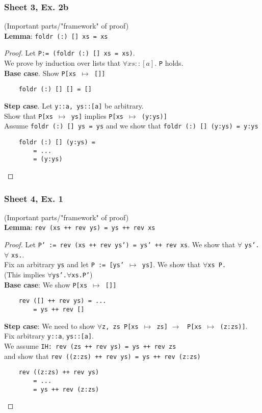 \documentclass[12pt]{article}
\def\li{\rightarrow}
\begin{document}
\subsubsection{Sheet 3, Ex. 2b}
(Important parts/"framework" of proof) \\
\textbf{Lemma}: \texttt{foldr (:) [] xs = xs}
\begin{proof}
    Let \texttt{P:= (foldr (:) [] xs = xs)}. \\
    We prove by induction over lists that $\forall xs::[a].$ \texttt{P} holds. \\
    \textbf{Base case}. Show \texttt{P[xs $\mapsto$ []]} 
    \begin{verbatim}
    foldr (:) [] [] = [] 
    \end{verbatim}
    \textbf{Step case}. Let \texttt{y::a, ys::[a]} be arbitrary. \\
    Show that \texttt{P[xs $\mapsto$ ys]} implies \texttt{P[xs $\mapsto$ (y:ys)]} \\
    Assume \texttt{foldr (:) [] ys = ys} and we show that \texttt{foldr (:) [] (y:ys) = y:ys}
    \begin{verbatim}
    foldr (:) [] (y:ys) = 
        = ...
        = (y:ys)
    \end{verbatim}
\end{proof}
\subsubsection{Sheet 4, Ex. 1}
(Important parts/"framework" of proof) \\
\textbf{Lemma}: \texttt{rev (xs ++ rev ys) = ys ++ rev xs}
\begin{proof}
    Let \texttt{P' := rev (xs ++ rev ys') = ys' ++ rev xs}. 
    We show that $\forall$ \texttt{ys'.}$\forall$ \texttt{xs.}. \\
    Fix an arbitrary \texttt{ys} and let \texttt{P := [ys' $\mapsto$ ys]}.
    We show that $\forall$\texttt{xs P.} \\
    (This implies $\forall$\texttt{ys'.}$\forall$\texttt{xs.P'}) \\
    \textbf{Base case}: We show \texttt{P[xs $\mapsto$ []]} 
    \begin{verbatim}
    rev ([] ++ rev ys) = ...
        = ys ++ rev []
    \end{verbatim}
    \textbf{Step case}: We need to show 
    $\forall$\texttt{z, zs P[xs $\mapsto$ zs]} $\li$ \texttt{ P[xs $\mapsto$ (z:zs)]}.\\
    Fix arbitrary \texttt{y::a}, \texttt{ys::[a]}. \\
    We assume \texttt{IH: rev (zs ++ rev ys) = ys ++ rev zs} \\
    and show that \texttt{rev ((z:zs) ++ rev ys) = ys ++ rev (z:zs)}
    
    \begin{verbatim}
    rev ((z:zs) ++ rev ys)
        = ...
        = ys ++ rev (z:zs)
    \end{verbatim}
\end{proof}
\end{document}
